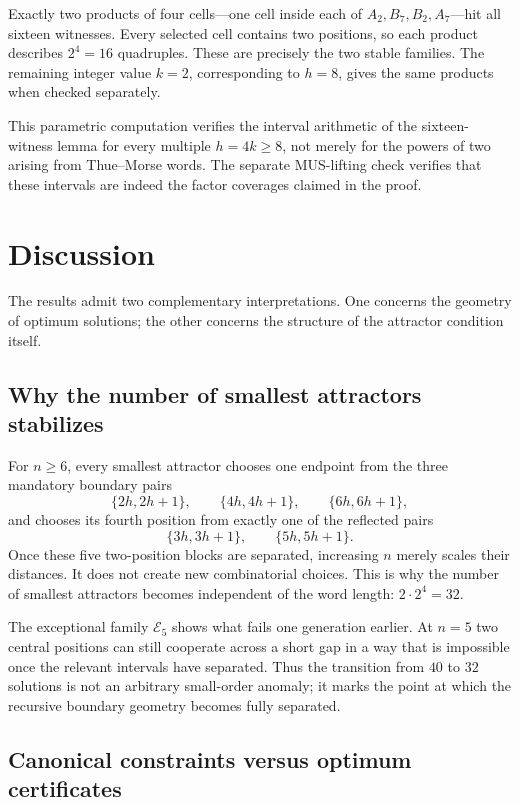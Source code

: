 \documentclass[11pt,a4paper]{article}
\theoremstyle{definition}\newtheorem{definition}[theorem]{Definition}
\theoremstyle{remark}\newtheorem{remark}[theorem]{Remark}
\begin{document}
Exactly two products of four cells---one cell inside each of $A_2,B_7,B_2,A_7$---hit all sixteen witnesses.  Every selected cell contains two positions, so each product describes $2^4=16$ quadruples.  These are precisely the two stable families.  The remaining integer value $k=2$, corresponding to $h=8$, gives the same products when checked separately.

This parametric computation verifies the interval arithmetic of the sixteen-witness lemma for every multiple $h=4k\ge8$, not merely for the powers of two arising from Thue--Morse words.  The separate MUS-lifting check verifies that these intervals are indeed the factor coverages claimed in the proof.


\section{Discussion}
\label{sec:discussion-extended}

The results admit two complementary interpretations.  One concerns the geometry of optimum solutions; the other concerns the structure of the attractor condition itself.

\subsection{Why the number of smallest attractors stabilizes}
\label{subsec:why-32}

For $n\ge6$, every smallest attractor chooses one endpoint from the three mandatory boundary pairs
\[
 \{2h,2h+1\},\qquad
 \{4h,4h+1\},\qquad
 \{6h,6h+1\},
\]
and chooses its fourth position from exactly one of the reflected pairs
\[
 \{3h,3h+1\},
 \qquad
 \{5h,5h+1\}.
\]
Once these five two-position blocks are separated, increasing $n$ merely scales their distances.  It does not create new combinatorial choices.  This is why the number of smallest attractors becomes independent of the word length:
$
 2\cdot2^4=32.
$

The exceptional family $\mathcal E_5$ shows what fails one generation earlier.  At $n=5$ two central positions can still cooperate across a short gap in a way that is impossible once the relevant intervals have separated.  Thus the transition from $40$ to $32$ solutions is not an arbitrary small-order anomaly; it marks the point at which the recursive boundary geometry becomes fully separated.

\subsection{Canonical constraints versus optimum certificates}
\label{subsec:two-levels}
\end{document}
